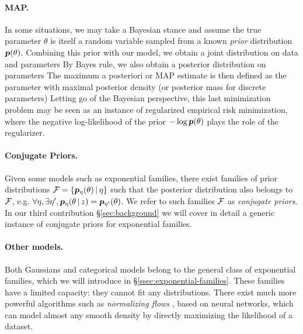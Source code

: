 \paragraph{MAP.}
In some situations, we may take a Bayesian stance and assume the true parameter $\theta$ is itself a random variable sampled from a known \emph{prior} distribution $\bm{p}(\theta)$. 
Combining this prior with our model, we obtain a joint distribution on data and parameters 
By Bayes rule, we also obtain a posterior distribution on parameters 
The maximum a posteriori or MAP estimate is then defined as the parameter with maximal posterior density (or posterior mass for discrete parameters)
Letting go of the Bayesian perspective, this last minimization problem may be seen as an instance of regularized empirical risk minimization, where the negative log-likelihood of the prior $- \log \bm{p}(\theta)$ plays the role of the regularizer.

\paragraph{Conjugate Priors.}
Given some models such as exponential families, there exist families of prior distributions ${\mathcal F} = \{\bm{p}_\eta (\theta) \,\vert\, \eta\}$ 
such that the posterior distribution also belongs to ${\mathcal F}$, 
e.g.  $\forall \eta, \exists \eta', \bm{p}_\eta (\theta \,\vert\, z) = \bm{p}_{\eta'}(\theta)$.
We refer to such families ${\mathcal F}$ as \emph{conjugate priors}.
In our third contribution \S\ref{sec:background} we will cover in detail a generic instance of conjugate priors for exponential families.

\paragraph{Other models.}
Both Gaussians and categorical models belong to the general class of exponential families, which we will introduce in \S\ref{ssec:exponential-families}.
These families have a limited capacity: they cannot fit any distributions.
There exist much more powerful algorithms such as \emph{normalizing flows} \citep{rezende2015variational}, based on neural networks, which can model almost any smooth density by directly maximizing the likelihood of a dataset.


